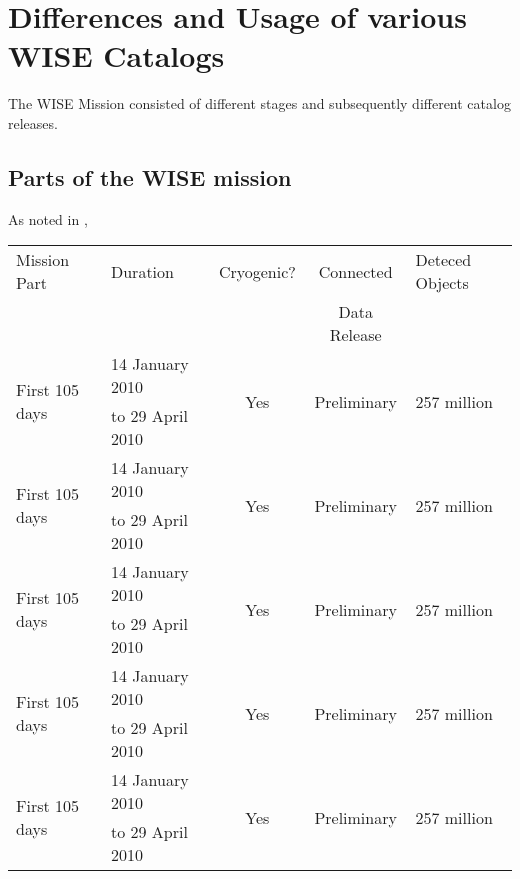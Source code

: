 \documentclass[usenatbib]{mn2e}
\begin{document}
\appendix

\section{Differences and Usage of various WISE Catalogs}
The WISE Mission consisted of different stages and subsequently different catalog releases. 

\subsection{Parts of the WISE mission}
As noted in \cite{Meisner16}, 

\begin{table*}
  \centering
   \begin{tabular}{l l c c l}
\hline
\hline
Mission Part        & Duration                   & Cryogenic?     &  Connected & Deteced Objects \\
                           &                                 &                       & Data Release & \\
\hline
\multirow{2}{*}{First 105 days} &  14 January 2010           & \multirow{2}{*}{Yes}  & \multirow{2}{*}{Preliminary} & \multirow{2}{*}{257 million}\\
                                                 &      to 29 April 2010      &                                  &                                             &  \\
\multirow{2}{*}{First 105 days} &  14 January 2010           & \multirow{2}{*}{Yes}  & \multirow{2}{*}{Preliminary} & \multirow{2}{*}{257 million}\\
                                                 &      to 29 April 2010      &                                  &                                             &  \\
\multirow{2}{*}{First 105 days} &  14 January 2010           & \multirow{2}{*}{Yes}  & \multirow{2}{*}{Preliminary} & \multirow{2}{*}{257 million}\\
                                                 &      to 29 April 2010      &                                  &                                             &  \\
\multirow{2}{*}{First 105 days} &  14 January 2010           & \multirow{2}{*}{Yes}  & \multirow{2}{*}{Preliminary} & \multirow{2}{*}{257 million}\\
                                                 &      to 29 April 2010      &                                  &                                             &  \\
\multirow{2}{*}{First 105 days} &  14 January 2010           & \multirow{2}{*}{Yes}  & \multirow{2}{*}{Preliminary} & \multirow{2}{*}{257 million}\\
                                                 &      to 29 April 2010      &                                  &                                             &  \\
\hline
\hline
\end{tabular}
       \caption{}
       \label{tab:WISE_cats}
\end{table*}
\end{document}
